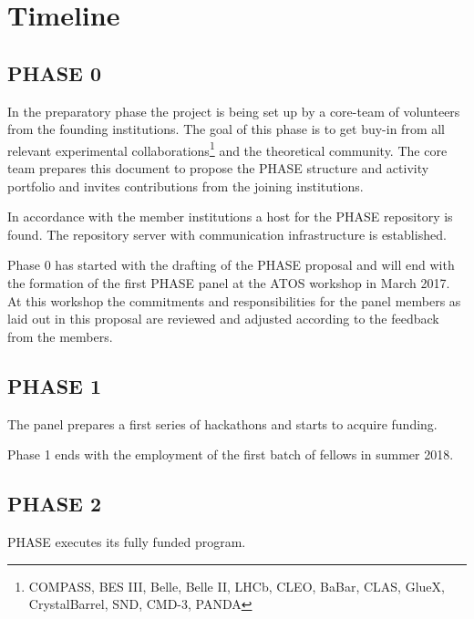 \section{Timeline}

\subsection{PHASE 0}
In the preparatory phase the project is being set up by a core-team of volunteers from the founding institutions. The goal of this phase is to get buy-in from all relevant
experimental collaborations\footnote{COMPASS, BES III, Belle, Belle II, LHCb, CLEO, BaBar, CLAS, GlueX, CrystalBarrel, SND, CMD-3, PANDA} and the theoretical community.  The core team prepares this document to propose the PHASE structure and activity portfolio and invites contributions from the joining institutions.

In accordance with the member institutions a host for the PHASE repository is found. The repository server with communication infrastructure is established.

Phase 0 has started with the drafting of the PHASE proposal and will end with the formation of the first PHASE panel at the ATOS workshop in March 2017. At this workshop the commitments and responsibilities for the panel members as laid out in this proposal are reviewed and adjusted according to the feedback from the members.

\subsection{PHASE 1}
The panel prepares a first series of hackathons and starts to acquire funding.

Phase 1 ends with the employment of the first batch of fellows in summer 2018.
\subsection{PHASE 2}
PHASE executes its fully funded program.